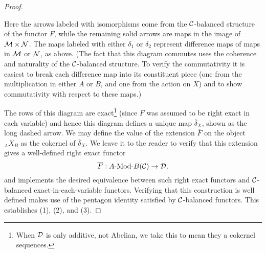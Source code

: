\documentclass{amsart}
\begin{document}
\begin{proof}
\begin{center}
	\end{center}
Here the arrows labeled with isomorphisms come from the $\mathcal C$-balanced structure of the functor $F$, while the remaining solid arrows are maps in the image of $\mathcal M \times \mathcal N$. The maps labeled with either $\delta_1$ or $\delta_2$ represent difference maps of maps in $\mathcal M$ or $\mathcal N$, as above.  (The fact that this diagram commutes uses the coherence and naturality of the $\mathcal C$-balanced structure. To verify the commutativity it is easiest to break each difference map into its constituent piece (one from the multiplication in either $A$ or $B$, and one from the action on $X$) and to show commutativity with respect to these maps.)

The rows of this diagram are exact\footnote{When $\mathcal D$ is only additive, not Abelian, we take this to mean they a cokernel sequences.} (since $F$ was assumed to be right exact in each variable) and hence this diagram defines a unique map $\overline{\delta}_X$, shown as the long dashed arrow. We may define the value of the extension $\overline{F}$ on the object ${}_AX_B$ as the cokernel of $\overline{\delta}_X$. We leave it to the reader to verify that this extension gives a well-defined right exact functor 
\begin{equation*}
	\overline{F}: \Mod{A}{B}(\cC) \to \cD,
\end{equation*} 
and implements the desired equivalence between such right exact functors and $\mathcal C$-balanced exact-in-each-variable functors. Verifying that this construction is well defined makes use of the pentagon identity satisfied by $\mathcal C$-balanced functors. This establishes (1), (2), and (3). 


\end{proof}
\end{document}
